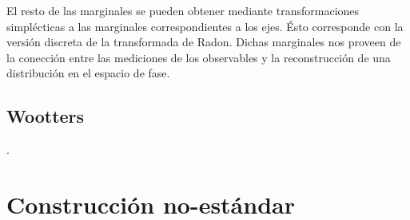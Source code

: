 \documentclass[a4paper]{report}
\begin{document}
  El resto de las marginales se pueden obtener mediante
  transformaciones simplécticas a las marginales
  correspondientes a los ejes. Ésto corresponde con la
  versión discreta de la transformada de Radon. Dichas
  marginales nos proveen de la conección entre las
  mediciones de los observables y la reconstrucción de una
  distribución en el espacio de fase.

  \section{Wootters}

  .

  \chapter{Construcción no-estándar}

  \newpage
  \appendix

  \newpage
  \printbibliography
\end{document}

